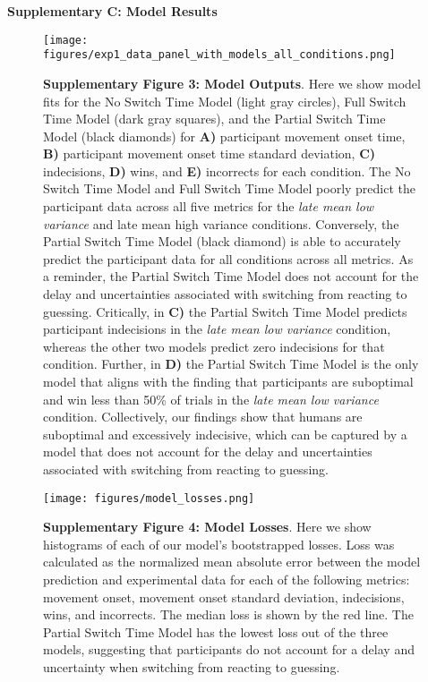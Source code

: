 \documentclass[12pt]{article}
\newcommand\boldblue[1]{\textcolor{mydarkblue}{\textbf{#1}}}
\begin{document}
\newpage
\noindent\boldblue{\large\textcolor{mydarkblue}{Supplementary C: Model Results}}

\begin{figure}[H]
    \begin{minipage}[c]{0.6\textwidth}
        \texttt{[image: figures/exp1\_data\_panel\_with\_models\_all\_conditions.png]}
    \end{minipage}\hfill
    \begin{minipage}[c]{0.3\textwidth}
        \caption*{
            \boldblue{Supplementary Figure 3: Model Outputs}. Here we show model fits for the No Switch Time Model (light gray circles), Full Switch Time Model (dark gray squares), and the Partial Switch Time Model (black diamonds) for \boldblue{A)} participant movement onset time, \boldblue{B)} participant movement onset time standard deviation, \boldblue{C)} indecisions, \boldblue{D)} wins, and \boldblue{E)} incorrects for each condition. The No Switch Time Model and Full Switch Time Model poorly predict the participant data across all five metrics for the \emph{late mean low variance} and late mean high variance conditions. Conversely, the Partial Switch Time Model (black diamond) is able to accurately predict the participant data for all conditions across all metrics. As a reminder, the Partial Switch Time Model does not account for the delay and uncertainties associated with switching from reacting to guessing. Critically, in \boldblue{C)} the Partial Switch Time Model predicts participant indecisions in the \emph{late mean low variance} condition, whereas the other two models predict zero indecisions for that condition. Further, in \boldblue{D)} the Partial Switch Time Model is the only model that aligns with the finding that participants are suboptimal and win less than 50\% of trials in the \emph{late mean low variance} condition. Collectively, our findings show that humans are suboptimal and excessively indecisive, which can be captured by a model that does not account  for the delay and uncertainties associated with switching from reacting to guessing.
        } 
    \end{minipage}
\end{figure}

\begin{figure}[H]
    \centering 
    \texttt{[image: figures/model\_losses.png]}

        \caption*{
            \boldblue{Supplementary Figure 4: Model Losses}. Here we show histograms of each of our model’s bootstrapped losses. Loss was calculated as the normalized mean absolute error between the model prediction and experimental data for each of the following metrics: movement onset, movement onset standard deviation, indecisions, wins, and incorrects. The median loss is shown by the red line. The Partial Switch Time Model has the lowest loss out of the three models, suggesting that participants do not account for a delay and uncertainty when switching from reacting to guessing. 
        } 
\end{figure}
\end{document}
